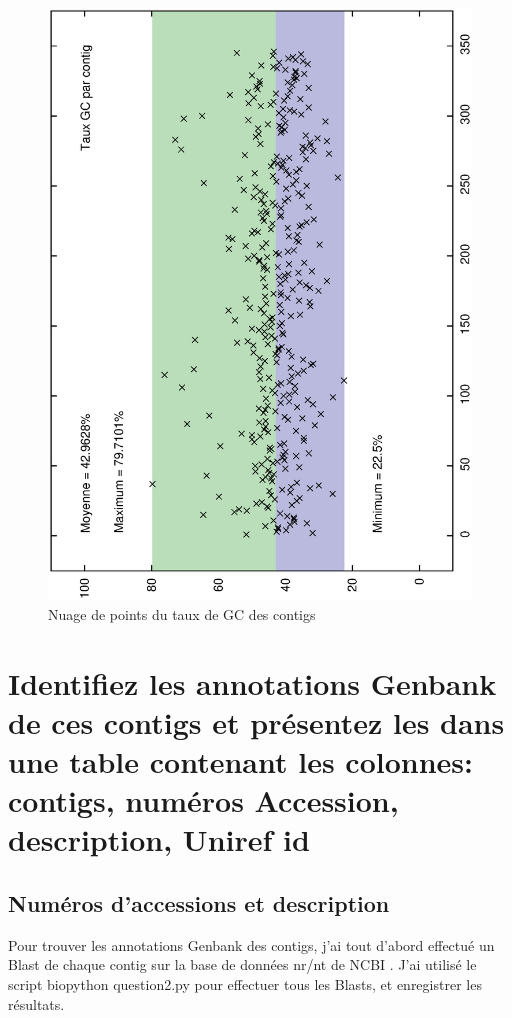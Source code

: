 \documentclass[10.9pt]{article} %
\begin{document}
\begin{figure}[p]
\includegraphics[scale=0.6,angle=270]{question_1/contigs_taux.eps}
\caption{Nuage de points du taux de GC des contigs}
\end{figure}


\newpage
\section{Identifiez les annotations Genbank de ces contigs et présentez les dans une table contenant
les colonnes: contigs, numéros Accession, description, Uniref id} %

\subsection{Numéros d'accessions et description}
Pour trouver les annotations Genbank des contigs, j'ai tout d'abord effectué un Blast de chaque contig
sur la base de données nr/nt de NCBI \cite{BLAST}. J'ai utilisé le script biopython question2.py pour
effectuer tous les Blasts, et enregistrer les résultats.
\end{document}
